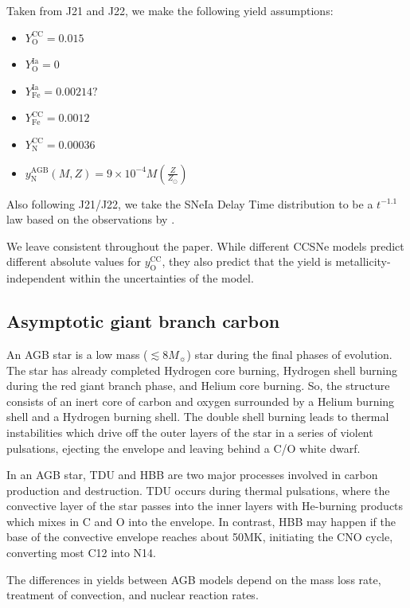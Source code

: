 \documentclass[fleqn,usenatbib]{mnras}
\begin{document}
Taken from J21 and J22, we make the following yield assumptions:
\begin{itemize}
    \item $Y_\text{O}^\text{CC} = 0.015$
    \item $Y_\text{O}^\text{Ia} = 0$
    \item $Y_\text{Fe}^\text{Ia} = 0.00214?$
    \item $Y_\text{Fe}^\text{CC} = 0.0012$
    \item $Y_\text{N}^\text{CC} = 0.00036$
    \item $y_\text{N}^\text{AGB}(M, Z) = 9\times 10^{-4} M \left(\frac{Z}{Z_\odot}\right)$
\end{itemize}
Also following J21/J22, we take the SNeIa Delay Time distribution to be a $t^{-1.1}$ law based on
the observations by \citet{maoz+12}.

We leave consistent throughout the paper. While different CCSNe models predict different absolute values for $y_\text{O}^\text{CC}$, they also predict that the yield is metallicity-independent within the uncertainties of the model. 





\subsection{Asymptotic giant branch carbon}

An AGB star is a low mass ($\lesssim 8 M_{\sun}$) star during the final phases of evolution. The star has already completed Hydrogen core burning, Hydrogen shell burning during the red giant branch phase, and Helium core burning. So, the structure consists of an inert core of carbon and oxygen surrounded by a Helium burning shell and a Hydrogen burning shell. The double shell burning leads to thermal instabilities which drive off the outer layers of the star in a series of violent pulsations, ejecting the envelope and leaving behind a C/O white dwarf. 

In an AGB star, TDU and HBB are two major processes involved in carbon production and destruction. TDU occurs during thermal pulsations, where the convective layer of the star passes into the inner layers with He-burning products which mixes in C and O into the envelope. In contrast, HBB may happen if the base of the convective envelope reaches about 50MK, initiating the CNO cycle, converting most C12 into N14. 

The differences in yields between AGB models depend on the mass loss rate, treatment of convection, and nuclear reaction rates. 
\end{document}
